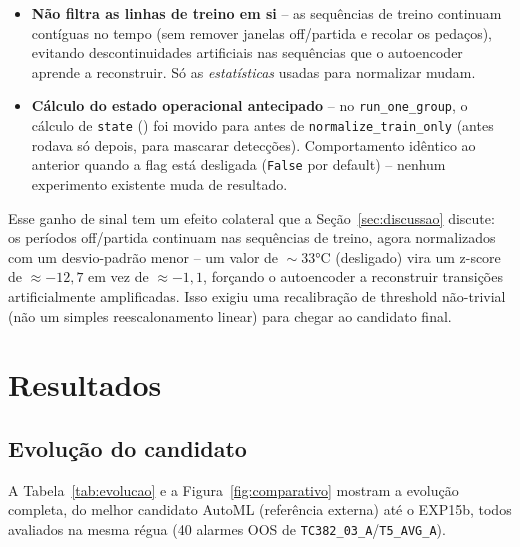 \documentclass[11pt,a4paper]{article}
\begin{document}
\begin{itemize}[leftmargin=1.4em]
  \item \textbf{Não filtra as linhas de treino em si} -- as sequências
    de treino continuam contíguas no tempo (sem remover janelas
    off/partida e recolar os pedaços), evitando descontinuidades
    artificiais nas sequências que o autoencoder aprende a reconstruir.
    Só as \emph{estatísticas} usadas para normalizar mudam.
  \item \textbf{Cálculo do estado operacional antecipado} -- no
    \texttt{run\_one\_group}, o cálculo de \texttt{state}
    () foi movido para antes de
    \texttt{normalize\_train\_only} (antes rodava só depois, para
    mascarar detecções). Comportamento idêntico ao anterior quando a
    flag está desligada (\texttt{False} por default) -- nenhum
    experimento existente muda de resultado.
\end{itemize}

Esse ganho de sinal tem um efeito colateral que a Seção~\ref{sec:discussao}
discute: os períodos off/partida continuam nas sequências de treino,
agora normalizados com um desvio-padrão menor -- um valor de $\sim$33°C
(desligado) vira um z-score de $\approx{-}12{,}7$ em vez de
$\approx{-}1{,}1$, forçando o autoencoder a reconstruir transições
artificialmente amplificadas. Isso exigiu uma recalibração de threshold
não-trivial (não um simples reescalonamento linear) para chegar ao
candidato final.

\section{Resultados}
\label{sec:resultados}

\subsection{Evolução do candidato}

A Tabela~\ref{tab:evolucao} e a Figura~\ref{fig:comparativo} mostram a
evolução completa, do melhor candidato AutoML (referência externa) até
o EXP15b, todos avaliados na mesma régua (40 alarmes OOS de
\texttt{TC382\_03\_A}/\texttt{T5\_AVG\_A}).
\end{document}
